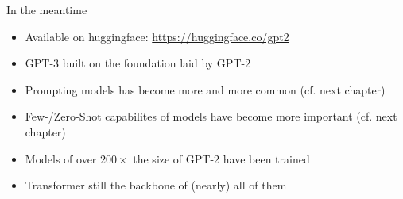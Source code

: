 
\begin{frame}{In the meantime}

\vfill

\begin{itemize}
	\item Available on huggingface: \url{https://huggingface.co/gpt2}
	\item GPT-3 built on the foundation laid by GPT-2
	\item Prompting models has become more and more common (cf. next chapter)
	\item Few-/Zero-Shot capabilites of models have become more important (cf. next chapter)
	\item Models of over $200\times$ the size of GPT-2 have been trained
	\item Transformer still the backbone of (nearly) all of them
\end{itemize}

\vfill

\end{frame}


\endlecture

